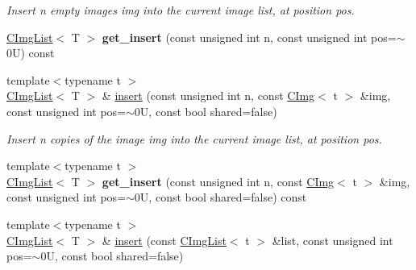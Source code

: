 \begin{DoxyCompactItemize}
\begin{DoxyCompactList}\small\item\em Insert n empty images img into the current image list, at position {\ttfamily pos}. \item\end{DoxyCompactList}\item 
\hypertarget{structcimg__library_1_1CImgList_afb191e12a181d7d82ab695e4ff3f3e8d}{
\hyperlink{structcimg__library_1_1CImgList}{CImgList}$<$ T $>$ {\bfseries get\_\-insert} (const unsigned int n, const unsigned int pos=$\sim$0U) const }
\label{structcimg__library_1_1CImgList_afb191e12a181d7d82ab695e4ff3f3e8d}

\item 
\hypertarget{structcimg__library_1_1CImgList_a3aee11aedb70021fb00593565a58be5d}{
{\footnotesize template$<$typename t $>$ }\\\hyperlink{structcimg__library_1_1CImgList}{CImgList}$<$ T $>$ \& \hyperlink{structcimg__library_1_1CImgList_a3aee11aedb70021fb00593565a58be5d}{insert} (const unsigned int n, const \hyperlink{structcimg__library_1_1CImg}{CImg}$<$ t $>$ \&img, const unsigned int pos=$\sim$0U, const bool shared=false)}
\label{structcimg__library_1_1CImgList_a3aee11aedb70021fb00593565a58be5d}

\begin{DoxyCompactList}\small\item\em Insert n copies of the image {\ttfamily img} into the current image list, at position {\ttfamily pos}. \item\end{DoxyCompactList}\item 
\hypertarget{structcimg__library_1_1CImgList_a2f641087c86c3034a537e877f245f443}{
{\footnotesize template$<$typename t $>$ }\\\hyperlink{structcimg__library_1_1CImgList}{CImgList}$<$ T $>$ {\bfseries get\_\-insert} (const unsigned int n, const \hyperlink{structcimg__library_1_1CImg}{CImg}$<$ t $>$ \&img, const unsigned int pos=$\sim$0U, const bool shared=false) const }
\label{structcimg__library_1_1CImgList_a2f641087c86c3034a537e877f245f443}

\item 
\hypertarget{structcimg__library_1_1CImgList_a9240333e196899711406545f727b0539}{
{\footnotesize template$<$typename t $>$ }\\\hyperlink{structcimg__library_1_1CImgList}{CImgList}$<$ T $>$ \& \hyperlink{structcimg__library_1_1CImgList_a9240333e196899711406545f727b0539}{insert} (const \hyperlink{structcimg__library_1_1CImgList}{CImgList}$<$ t $>$ \&list, const unsigned int pos=$\sim$0U, const bool shared=false)}
\label{structcimg__library_1_1CImgList_a9240333e196899711406545f727b0539}


\end{DoxyCompactItemize}

